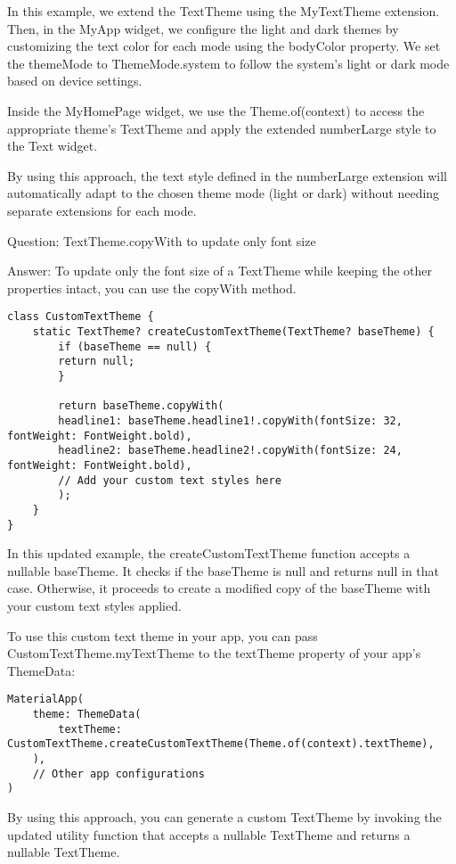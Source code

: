 In this example, we extend the TextTheme using the MyTextTheme extension. Then, in the MyApp widget, we configure the 
light and dark themes by customizing the text color for each mode using the bodyColor property. We set the themeMode 
to ThemeMode.system to follow the system's light or dark mode based on device settings.

Inside the MyHomePage widget, we use the Theme.of(context) to access the appropriate theme's TextTheme and apply 
the extended numberLarge style to the Text widget.

By using this approach, the text style defined in the numberLarge extension will automatically adapt to the chosen 
theme mode (light or dark) without needing separate extensions for each mode.


Question: TextTheme.copyWith to update only font size

Answer: To update only the font size of a TextTheme while keeping the other properties intact, you can use the 
copyWith method. 

\begin{lstlisting}
class CustomTextTheme {
    static TextTheme? createCustomTextTheme(TextTheme? baseTheme) {
        if (baseTheme == null) {
        return null;
        }
        
        return baseTheme.copyWith(
        headline1: baseTheme.headline1!.copyWith(fontSize: 32, fontWeight: FontWeight.bold),
        headline2: baseTheme.headline2!.copyWith(fontSize: 24, fontWeight: FontWeight.bold),
        // Add your custom text styles here
        );
    }
}     
\end{lstlisting}

In this updated example, the createCustomTextTheme function accepts a nullable baseTheme. It checks if the 
baseTheme is null and returns null in that case. Otherwise, it proceeds to create a modified copy of the 
baseTheme with your custom text styles applied.

To use this custom text theme in your app, you can pass CustomTextTheme.myTextTheme to the textTheme property of 
your app's ThemeData:

\begin{lstlisting}
MaterialApp(
    theme: ThemeData(
        textTheme: CustomTextTheme.createCustomTextTheme(Theme.of(context).textTheme),
    ),
    // Other app configurations
)   
\end{lstlisting}

By using this approach, you can generate a custom TextTheme by invoking the updated utility function that accepts a 
nullable TextTheme and returns a nullable TextTheme.

